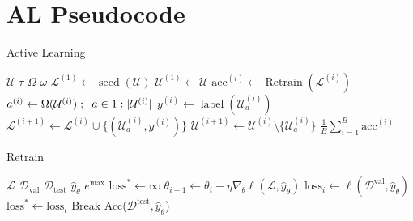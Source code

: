 \documentclass[]{article}
\begin{document}
\section{AL Pseudocode}
\begin{algorithm}[H]
	\caption{Active Learning}\label{alg:active_learning}
	\begin{algorithmic}[1]
		\Require $\mathcal{U}$ 
		\Require $\tau$ 
		\Require $\Omega$ 
		\Require $\omega$ 
		\State $\mathcal{L}^{(1)} \gets \operatorname{seed}(\mathcal{U})$  
		\State $\mathcal{U}^{(1)} \gets \mathcal{U}$
		\State $\text{acc}^{(i)} \gets \operatorname{Retrain}(\mathcal{L}^{(i)})$  %
		\State $a^{(i)} \gets \Omega(\mathcal{U}^{(i)}) \hspace{1mm};\hspace{2mm} a \in 1:|\mathcal{U}^{(i)}|$ 
		\State $y^{(i)} \gets \operatorname{label}(\mathcal{U}^{(i)}_{a})$ 
		\State $\mathcal{L}^{(i+1)} \gets \mathcal{L}^{(i)} \cup \{(\mathcal{U}^{(i)}_a, y^{(i)})\}$
		\State $\mathcal{U}^{(i+1)} \gets \mathcal{U}^{(i)} \setminus \{\mathcal{U}^{(i)}_a\}$
		\EndFor
		\State
		\Return $\frac{1}{B} \sum_{i=1}^{B} \text{acc}^{(i)}$
	\end{algorithmic}
\end{algorithm}

\begin{algorithm}[H]
	\caption{Retrain}\label{alg:retrain}
	\begin{algorithmic}[1]
		\Require $\mathcal{L}$ 
		\Require $\mathcal{D}_\text{val}$ 
		\Require $\mathcal{D}_\text{test}$ 
		\Require $\hat y_\theta$ 
		\Require $e^\text{max}$ 
		\State $\text{loss}^* \gets \infty$
		\State $\theta_{i+1} \gets \theta_i - \eta \nabla_\theta \ell(\mathcal{L}, \hat y_{\theta})$
		\State $\text{loss}_i \gets \ell(\mathcal{D}^\text{val}, \hat y_{\theta})$
		\State $\text{loss}^* \gets \text{loss}_i$
		\Else
		\State Break
		\EndIf
		\EndFor
		\State
		\Return Acc($\mathcal{D}^\text{test}, \hat y_{\theta}$)
	\end{algorithmic}
\end{algorithm}
\end{document}
